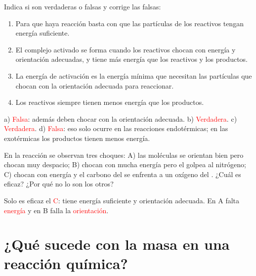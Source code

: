 \begin{exercise}
    Indica si son verdaderas o falsas y corrige las falsas:
    \begin{enumerate}[label=\alph*)]
        \item Para que haya reacción basta con que las partículas de los reactivos tengan energía suficiente.
        \item El complejo activado se forma cuando los reactivos chocan con energía y orientación adecuadas, y tiene más energía que los reactivos y los productos.
        \item La energía de activación es la energía mínima que necesitan las partículas que chocan con la orientación adecuada para reaccionar.
        \item Los reactivos siempre tienen menos energía que los productos.
    \end{enumerate}
    \begin{solu}
        a) \textcolor{red}{Falsa}: además deben chocar con la orientación adecuada. b) \textcolor{red}{Verdadera}. c) \textcolor{red}{Verdadera}. d) \textcolor{red}{Falsa}: eso solo ocurre en las reacciones endotérmicas; en las exotérmicas los productos tienen menos energía.
    \end{solu}
\end{exercise}

\begin{exercise}
    En la reacción  se observan tres choques: A) las moléculas se orientan bien pero chocan muy despacio; B) chocan con mucha energía pero el  golpea al nitrógeno; C) chocan con energía y el carbono del  se enfrenta a un oxígeno del . ¿Cuál es eficaz? ¿Por qué no lo son los otros?
    \begin{solu}
        Solo es eficaz el \textcolor{red}{C}: tiene energía suficiente y orientación adecuada. En A falta \textcolor{red}{energía} y en B falla la \textcolor{red}{orientación}.
    \end{solu}
\end{exercise}

\section{¿Qué sucede con la masa en una reacción química?}

